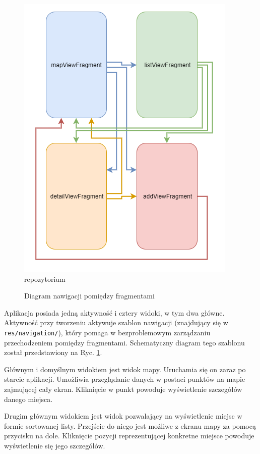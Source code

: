 \documentclass[polish,polish,a4paper,12pt]{article}
\begin{document}
		\begin{figure}[H]
			\centering
			\includegraphics[width = \textwidth]{navigation}repozytorium
			\caption{Diagram nawigacji pomiędzy fragmentami}
			\label{fig:navigation}
		\end{figure}

		Aplikacja posiada jedną aktywność i cztery widoki, w tym dwa główne. Aktywność przy tworzeniu aktywuje szablon nawigacji (znajdujący się w \texttt{res/navigation/}), który pomaga w bezproblemowym zarządzaniu przechodzeniem pomiędzy fragmentami. Schematyczny diagram tego szablonu został przedstawiony na Ryc. \ref{fig:navigation}.

		Głównym i domyślnym widokiem jest widok mapy. Uruchamia się on zaraz po starcie aplikacji. Umożliwia przeglądanie danych w postaci punktów na mapie zajmującej cały ekran. Kliknięcie w punkt powoduje wyświetlenie szczegółów danego miejsca.

		Drugim głównym widokiem jest widok pozwalający na wyświetlenie miejsc w formie sortowanej listy. Przejście do niego jest możliwe z ekranu mapy za pomocą przycisku na dole. Kliknięcie pozycji reprezentującej konkretne miejsce powoduje wyświetlenie się jego szczegółów.
\end{document}
